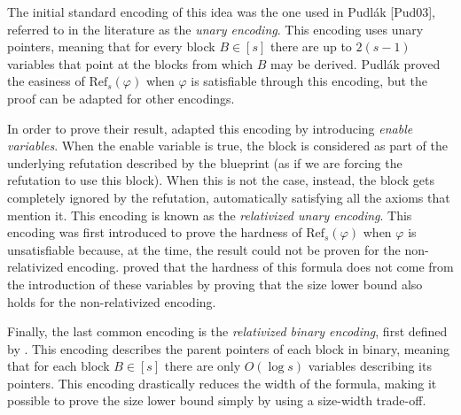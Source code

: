 The initial standard encoding of this idea was the one used in Pudlák [Pud03], referred to in the literature as the \textit{unary encoding}. This encoding uses unary pointers, meaning that for every block $B \in [s]$ there are up to $2(s-1)$ variables that point at the blocks from which $B$ may be derived. Pudlák proved the easiness of $\mathrm{Ref}_s(\varphi)$ when $\varphi$ is satisfiable through this encoding, but the proof can be adapted for other encodings.

In order to prove their result, \textcite{res_nphard} adapted this encoding by introducing \textit{enable variables}. When the enable variable is true, the block is considered as part of the underlying refutation described by the blueprint (as if we are forcing the refutation to use this block). When this is not the case, instead, the block gets completely ignored by the refutation, automatically satisfying all the axioms that mention it. This encoding is known as the \textit{relativized unary encoding}. This encoding was first introduced to prove the hardness of $\mathrm{Ref}_s(\varphi)$ when $\varphi$ is unsatisfiable because, at the time, the result could not be proven for the non-relativized encoding. \textcite{res_ref_bounds} proved that the hardness of this formula does not come from the introduction of these variables by proving that the size lower bound also holds for the non-relativized encoding. 

Finally, the last common encoding is the \textit{relativized binary encoding}, first defined by \textcite{alg_nphard}. This encoding describes the parent pointers of each block in binary, meaning that for each block $B \in [s]$ there are only $O(\log s)$ variables describing its pointers. This encoding drastically reduces the width of the formula, making it possible to prove the size lower bound simply by using a size-width trade-off.

